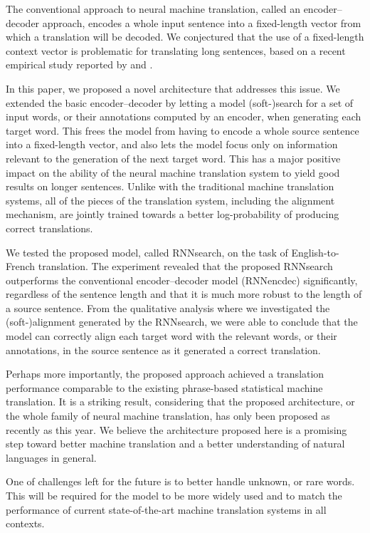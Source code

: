 \documentclass{article}
\begin{document}
The conventional approach to neural machine translation, called an
encoder--decoder approach, encodes a whole input sentence into a fixed-length
vector from which a translation will be decoded. We conjectured that the use of
a fixed-length context vector is problematic for translating long sentences,
based on a recent empirical study reported by \citet{Cho2014a} and
\citet{Pouget2014}.

In this paper, we proposed a novel architecture that addresses this issue. We
extended the basic encoder--decoder by letting a model \mbox{(soft-)search} for
a set of input words, or their annotations computed by an encoder, when
generating each target word. This frees the model from having to encode a whole
source sentence into a fixed-length vector, and also lets the model focus only
on information relevant to the generation of the next target word. This has a
major positive impact on the ability of the neural machine translation system to
yield good results on longer sentences. Unlike with the traditional machine
translation systems, all of the pieces of the translation system, including the
alignment mechanism, are jointly trained towards a better log-probability of
producing correct translations.

We tested the proposed model, called RNNsearch, on the task of English-to-French
translation. The experiment revealed that the proposed RNNsearch outperforms the
conventional encoder--decoder model (RNNencdec) significantly, regardless of the
sentence length and that it is much more robust to the length of a source
sentence. From the qualitative analysis where we investigated the
\mbox{(soft-)alignment} generated by the RNNsearch, we were able to conclude
that the model can correctly align each target word with the relevant words, or
their annotations, in the source sentence as it generated a correct translation.

Perhaps more importantly, the proposed approach achieved a translation
performance comparable to the existing phrase-based statistical machine
translation. It is a striking result, considering that the proposed
architecture, or the whole family of neural machine translation, has only been
proposed as recently as this year. We believe the architecture proposed here is
a promising step toward better machine translation and a better understanding of
natural languages in general.

One of challenges left for the future is to better handle unknown, or rare
words. This will be required for the model to be more widely used and to match
the performance of current state-of-the-art machine translation systems in all
contexts.
\end{document}
